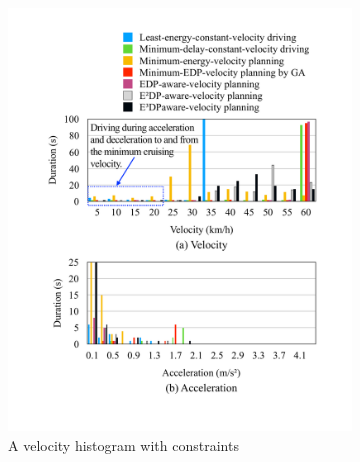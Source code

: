 \documentclass[onecolumn]{IEEEconf}
\begin{document}
\begin{description}
\begin{figure}[h!]
\begin{subfigure}{0.45\textwidth}
	\includegraphics[width=\hsize]{Figures/Histogram_vel.pdf}
	\caption{A velocity histogram with constraints}
	\label{fig:histogram_vel}
	\end{subfigure}
	\begin{subfigure}{0.45\textwidth}

\end{subfigure}
\end{figure}
\end{description}
\end{document}
